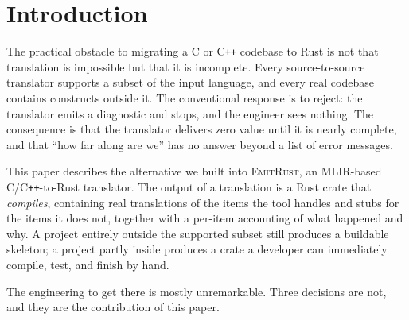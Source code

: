\documentclass[10pt,twocolumn]{article}
\newcommand{\tool}{\textsc{EmitRust}}
\begin{document}
\begin{abstract}
The colouring commits zero false negatives across all 1337 items, as its
contract requires. Three results qualify the design, and we report them
because each cost us a claim we had already written down. The repair search
improves 3 of 352 projects and regresses none---but all three are fixtures we
wrote to exercise it, so on non-synthetic input it improves nothing; an
earlier version of this evaluation reported nine improvements, six of which
turned out to be our own harness feeding multi-unit projects half their
source. A budget sweep shows our shipped search bound is four times larger
than any project needs. The middle value of our three-valued lattice is never assigned
by any project we measured. And we report a blind spot our own benchmark had
designed into it: library projects were unreachable under any flag, and no
program in the corpus could reveal it, because every one had been written with
an entry point so the differential oracle would have something to run.
\end{abstract}

\section{Introduction}
\label{sec:intro}

The practical obstacle to migrating a C or C\texttt{++} codebase to Rust is
not that translation is impossible but that it is incomplete. Every
source-to-source translator supports a subset of the input language, and every
real codebase contains constructs outside it. The conventional response is to
reject: the translator emits a diagnostic and stops, and the engineer sees
nothing. The consequence is that the translator delivers zero value until it
is nearly complete, and that ``how far along are we'' has no answer beyond a
list of error messages.

This paper describes the alternative we built into \tool{}, an MLIR-based
C/C\texttt{++}-to-Rust translator. The output of a translation is a Rust crate
that \emph{compiles}, containing real translations of the items the tool
handles and stubs for the items it does not, together with a per-item
accounting of what happened and why. A project entirely outside the supported
subset still produces a buildable skeleton; a project partly inside produces a
crate a developer can immediately compile, test, and finish by hand.

The engineering to get there is mostly unremarkable. Three decisions are not,
and they are the contribution of this paper.
\end{document}
